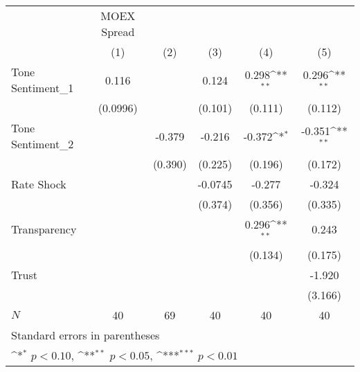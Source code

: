 {
\def\sym#1{\ifmmode^{#1}\else\(^{#1}\)\fi}
\begin{tabular}{l*{5}{c}}
\hline\hline
            & MOEX Spread         &                     &                     &                     &                     \\
            &\multicolumn{1}{c}{(1)}         &\multicolumn{1}{c}{(2)}         &\multicolumn{1}{c}{(3)}         &\multicolumn{1}{c}{(4)}         &\multicolumn{1}{c}{(5)}         \\
\hline
Tone Sentiment\_{1}&       0.116         &                     &       0.124         &       0.298\sym{**} &       0.296\sym{**} \\
            &    (0.0996)         &                     &     (0.101)         &     (0.111)         &     (0.112)         \\
[1em]
Tone Sentiment\_{2}&                     &      -0.379         &      -0.216         &      -0.372\sym{*}  &      -0.351\sym{**} \\
            &                     &     (0.390)         &     (0.225)         &     (0.196)         &     (0.172)         \\
[1em]
Rate Shock  &                     &                     &     -0.0745         &      -0.277         &      -0.324         \\
            &                     &                     &     (0.374)         &     (0.356)         &     (0.335)         \\
[1em]
Transparency&                     &                     &                     &       0.296\sym{**} &       0.243         \\
            &                     &                     &                     &     (0.134)         &     (0.175)         \\
[1em]
Trust       &                     &                     &                     &                     &      -1.920         \\
            &                     &                     &                     &                     &     (3.166)         \\
\hline
\(N\)       &          40         &          69         &          40         &          40         &          40         \\
\hline\hline
\multicolumn{6}{l}{\footnotesize Standard errors in parentheses}\\
\multicolumn{6}{l}{\footnotesize \sym{*} \(p<0.10\), \sym{**} \(p<0.05\), \sym{***} \(p<0.01\)}\\
\end{tabular}
}

